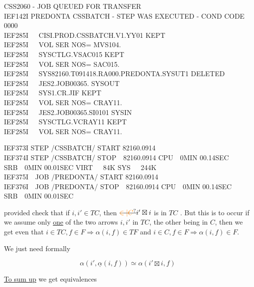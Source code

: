 {\scriptsize\ttfamily CSS2060 - JOB QUEUED FOR TRANSFER\\
IEF142I PREDONTA CSSBATCH - STEP WAS EXECUTED - COND CODE 0000\\
IEF285I~~~CISI.PROD.CSSBATCH.V1.YY01 \quad KEPT\\
IEF285I~~~VOL SER NOS= MVS104.\\
IEF285I~~~SYSCTLG.VSAC015 \quad KEPT\\
IEF285I~~~VOL SER NOS= SAC015.\\
IEF285I~~~SYS82160.T091418.RA000.PREDONTA.SYSUT1 \quad DELETED\\
IEF285I~~~JES2.JOB00365. \quad SYSOUT\\
IEF285I~~~SYS1.CR.JIF \quad KEPT\\
IEF285I~~~VOL SER NOS= CRAY11.\\
IEF285I~~~JES2.JOB00365.SI0101 \quad SYSIN\\
IEF285I~~~SYSCTLG.VCRAY11 \quad KEPT\\
IEF285I~~~VOL SER NOS= CRAY11.}

{\scriptsize\ttfamily IEF373I STEP /CSSBATCH/ START 82160.0914\\
IEF374I STEP /CSSBATCH/ STOP~~82160.0914 CPU~~0MIN 00.14SEC SRB~~0MIN 00.01SEC VIRT~~~84K SYS~~~244K\\
IEF375I~~JOB /PREDONTA/ START 82160.0914\\
IEF376I~~JOB /PREDONTA/ STOP~~82160.0914 CPU~~0MIN 00.14SEC SRB~~0MIN 00.01SEC}



provided  check that if $i,i'\in TC$,  then $\deleted{\unsure{\in|C}}i'\boxtimes i$ is in $TC$ . But  this is to occur if we assume only \uline{one} of the two arrows $i,i'$ in $TC$, the other being in $C$, then we get even that $i\in TC,f\in F\Longrightarrow\alpha(i,f)\in TF$ and $i\in C,f\in F\Rightarrow\alpha(i,f)\in F$.

We just need formally

\[
\alpha(i',\underline{\alpha}(i,f))\simeq\alpha(i'\boxtimes i,f)
\]

\uline{To sum up} we get equivalences

